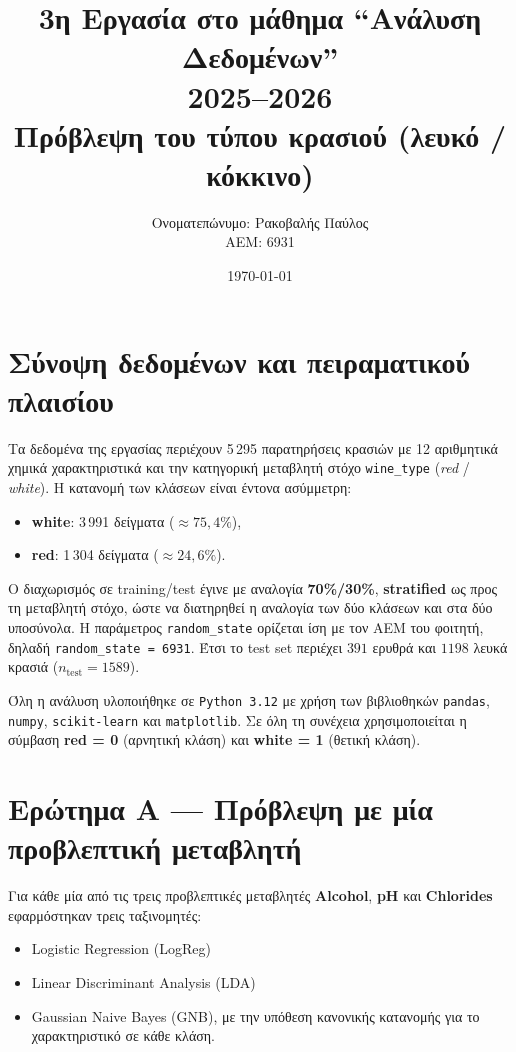 \documentclass[11pt,a4paper]{article}
\title{\textbf{3η Εργασία στο μάθημα ``Ανάλυση Δεδομένων'' \\ 2025--2026}\\[6pt]
\large Πρόβλεψη του τύπου κρασιού (λευκό / κόκκινο)}
\author{Ονοματεπώνυμο: Ρακοβαλής Παύλος \\
ΑΕΜ: 6931}
\date{\today}
\newcommand{\code}[1]{\texttt{#1}}
\begin{document}
\maketitle

\section*{Σύνοψη δεδομένων και πειραματικού πλαισίου}

Τα δεδομένα της εργασίας περιέχουν 5\,295 παρατηρήσεις κρασιών με 12
αριθμητικά χημικά χαρακτηριστικά και την κατηγορική μεταβλητή στόχο
\code{wine\_type} (\textit{red} / \textit{white}). Η κατανομή των κλάσεων είναι
έντονα ασύμμετρη:
\begin{itemize}[leftmargin=1.5cm]
    \item \textbf{white}: 3\,991 δείγματα ($\approx 75{,}4\%$),
    \item \textbf{red}:   1\,304 δείγματα ($\approx 24{,}6\%$).
\end{itemize}

Ο διαχωρισμός σε training/test έγινε με αναλογία \textbf{70\%/30\%},
\textbf{stratified} ως προς τη μεταβλητή στόχο, ώστε να διατηρηθεί η αναλογία
των δύο κλάσεων και στα δύο υποσύνολα. Η παράμετρος \code{random\_state}
ορίζεται ίση με τον ΑΕΜ του φοιτητή, δηλαδή \code{random\_state = 6931}.
Έτσι το test set περιέχει $391$ ερυθρά και $1198$ λευκά κρασιά
($n_{\text{test}} = 1589$).

Όλη η ανάλυση υλοποιήθηκε σε \code{Python 3.12} με χρήση των βιβλιοθηκών
\code{pandas}, \code{numpy}, \code{scikit-learn} και \code{matplotlib}.
Σε όλη τη συνέχεια χρησιμοποιείται η σύμβαση \textbf{red = 0} (αρνητική
κλάση) και \textbf{white = 1} (θετική κλάση).

\section{Ερώτημα Α — Πρόβλεψη με μία προβλεπτική μεταβλητή}

Για κάθε μία από τις τρεις προβλεπτικές μεταβλητές
\textbf{Alcohol}, \textbf{pH} και \textbf{Chlorides} εφαρμόστηκαν τρεις
ταξινομητές:
\begin{itemize}[leftmargin=1.5cm]
    \item Logistic Regression (LogReg)
    \item Linear Discriminant Analysis (LDA)
    \item Gaussian Naive Bayes (GNB), με την υπόθεση κανονικής κατανομής για
    το χαρακτηριστικό σε κάθε κλάση.
\end{itemize}
\end{document}
